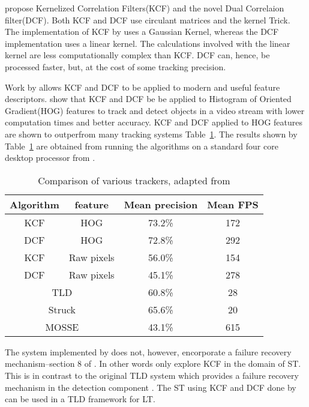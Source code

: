 \citeauthor{Enriques2014} \cite{Enriques2014} propose Kernelized Correlation Filters(KCF) and the novel Dual Correlaion filter(DCF).
Both KCF and DCF use circulant matrices and the kernel Trick.
The implementation of KCF by \citeauthor{Enriques2014} uses a Gaussian Kernel, whereas the DCF implementation uses a linear kernel.
The calculations involved with the linear kernel are less computationally complex than KCF. 
DCF can, hence, be processed faster, but, at the cost of some tracking precision.

Work by \citeauthor{multichannelCorrFilters} \cite{multichannelCorrFilters} allows KCF and DCF to be applied to modern and useful feature descriptors.
\citeauthor{Enriques2014} show that KCF and DCF be be applied to Histogram of Oriented Gradient(HOG) features to track and detect objects in a video stream with lower computation times and better accuracy.
KCF and DCF applied to HOG features are shown to outperfrom many tracking systems Table~\ref{tab:trackers}.
The results shown by Table~\ref{tab:trackers} are obtained from running the algorithms on a standard four core desktop processor from .

\begin{table}
  \centering
  \begin{tabular}[t]{cccc}
    \toprule
    Algorithm & feature & Mean precision & Mean FPS \\
    \midrule
    KCF       & HOG     & 73.2\%         & 172      \\
    \hline
    DCF       & HOG     & 72.8\%         & 292      \\
    \hline
    KCF       & Raw pixels & 56.0\%      & 154      \\
    \hline
    DCF       & Raw pixels & 45.1\%      & 278      \\
    \midrule
    \midrule
    \multicolumn{2}{c}{TLD}   & 60.8\%      &  28      \\
    \hline
    \multicolumn{2}{c}{Struck\cite{struck}}& 65.6\%     &  20     \\
    \hline
    \multicolumn{2}{c}{MOSSE\cite{mosse}}& 43.1\%      &  615     \\
    \bottomrule
  \end{tabular}
  \caption{Comparison of various trackers, adapted from \cite{Enriques2014}}
  \label{tab:trackers}
\end{table}

The system implemented by \citeauthor{Enriques2014} does not, however, encorporate a failure recovery mechanism--section 8 of \cite{Enriques2014}.
In other words \citeauthor{Enriques2014} only explore KCF in the domain of ST.
This is in contrast to the original TLD system which provides a failure recovery mechanism in the detection component \cite{Kalal2011}.
The ST using KCF and DCF done by \citeauthor{Enriques2014} can be used in a TLD framework for LT.

